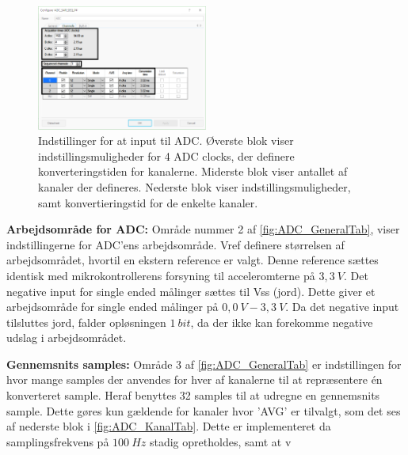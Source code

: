 \begin{figure}[H]
	\centering 
	\includegraphics[width=0.5\textwidth]{figures/ADC_instillinger2_edit.png}
	\caption{Indstillinger for at input til ADC. Øverste blok viser indstillingsmuligheder for 4 ADC clocks, der definere konverteringstiden for kanalerne. Miderste blok viser antallet af kanaler der defineres. Nederste blok viser indstillingsmuligheder, samt konvertieringstid for de enkelte kanaler.}
	\label{fig:ADC_KanalTab}
\end{figure}

\textbf{Arbejdsområde for ADC:}
Område nummer 2 af \autoref{fig:ADC_GeneralTab}, viser indstillingerne for ADC'ens arbejdsområde. Vref definere størrelsen af arbejdsområdet, hvortil en ekstern reference er valgt. Denne reference sættes identisk med mikrokontrollerens forsyning til acceleromterne på $3,3~V$. Det negative input for single ended målinger sættes til Vss (jord). Dette giver et arbejdsområde for single ended målinger på $0,0~V - 3,3~V$. Da det negative input tilsluttes jord, falder opløsningen $1~bit$, da der ikke kan forekomme negative udslag i arbejdsområdet. 

\textbf{Gennemsnits samples:}
Område 3 af \autoref{fig:ADC_GeneralTab} er indstillingen for hvor mange samples der anvendes for hver af kanalerne til at repræsentere én konverteret sample. Heraf benyttes 32 samples til at udregne en gennemsnits sample. Dette gøres kun gældende for kanaler hvor 'AVG' er tilvalgt, som det ses af nederste blok i \autoref{fig:ADC_KanalTab}. Dette er implementeret da samplingsfrekvens på $100~Hz$ stadig opretholdes, samt at v 





